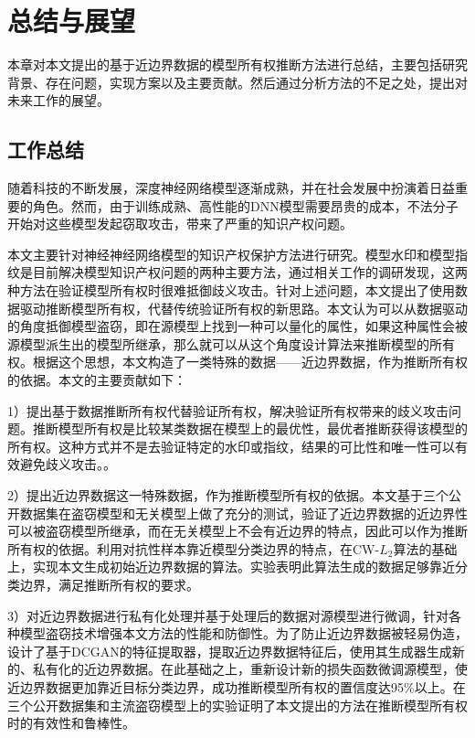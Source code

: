 \chapter{总结与展望}\label{6}

本章对本文提出的基于近边界数据的模型所有权推断方法进行总结，主要包括研究背景、存在问题，实现方案以及主要贡献。然后通过分析方法的不足之处，提出对未来工作的展望。

\section{工作总结}

随着科技的不断发展，深度神经网络模型逐渐成熟，并在社会发展中扮演着日益重要的角色。然而，由于训练成熟、高性能的DNN模型需要昂贵的成本，不法分子开始对这些模型发起窃取攻击，带来了严重的知识产权问题。

本文主要针对神经神经网络模型的知识产权保护方法进行研究。模型水印和模型指纹是目前解决模型知识产权问题的两种主要方法，通过相关工作的调研发现，这两种方法在验证模型所有权时很难抵御歧义攻击。针对上述问题，本文提出了使用数据驱动推断模型所有权，代替传统验证所有权的新思路。本文认为可以从数据驱动的角度抵御模型盗窃，即在源模型上找到一种可以量化的属性，如果这种属性会被源模型派生出的模型所继承，那么就可以从这个角度设计算法来推断模型的所有权。根据这个思想，本文构造了一类特殊的数据——近边界数据，作为推断所有权的依据。本文的主要贡献如下：

1）提出基于数据推断所有权代替验证所有权，解决验证所有权带来的歧义攻击问题。推断模型所有权是比较某类数据在模型上的最优性，最优者推断获得该模型的所有权。这种方式并不是去验证特定的水印或指纹，结果的可比性和唯一性可以有效避免歧义攻击。。

2）提出近边界数据这一特殊数据，作为推断模型所有权的依据。本文基于三个公开数据集在盗窃模型和无关模型上做了充分的测试，验证了近边界数据的近边界性可以被盗窃模型所继承，而在无关模型上不会有近边界的特点，因此可以作为推断所有权的依据。利用对抗性样本靠近模型分类边界的特点，在CW-$L_2$算法的基础上，实现本文生成初始近边界数据的算法。实验表明此算法生成的数据足够靠近分类边界，满足推断所有权的要求。

3）对近边界数据进行私有化处理并基于处理后的数据对源模型进行微调，针对各种模型盗窃技术增强本文方法的性能和防御性。为了防止近边界数据被轻易伪造，设计了基于DCGAN的特征提取器，提取近边界数据特征后，使用其生成器生成新的、私有化的近边界数据。在此基础之上，重新设计新的损失函数微调源模型，使近边界数据更加靠近目标分类边界，成功推断模型所有权的置信度达95\%以上。在三个公开数据集和主流盗窃模型上的实验证明了本文提出的方法在推断模型所有权时的有效性和鲁棒性。


